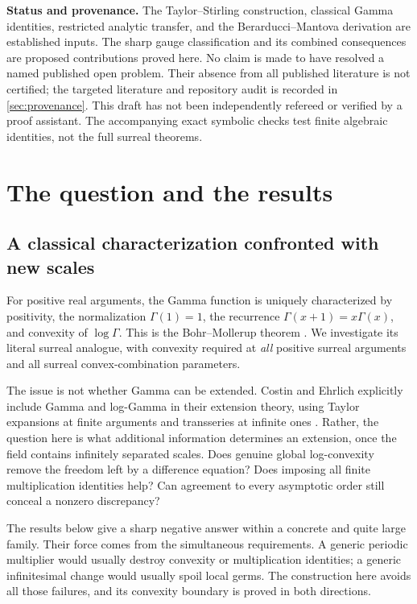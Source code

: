 \documentclass[11pt,letterpaper]{article}
\numberwithin{equation}{section}
\theoremstyle{plain}
\theoremstyle{definition}
\theoremstyle{remark}
\begin{document}
\begin{titlepage}
\begin{minipage}{0.94\textwidth}
\textbf{Status and provenance.}
The Taylor--Stirling construction, classical Gamma identities, restricted
analytic transfer, and the Berarducci--Mantova derivation are established inputs.
The sharp gauge classification and its combined consequences are proposed
contributions proved here. No claim is made to have resolved a named published
open problem. Their absence from all published literature is not certified;
the targeted literature and repository audit is recorded in
\cref{sec:provenance}. This draft has not been independently refereed or
verified by a proof assistant. The accompanying exact symbolic checks test
finite algebraic identities, not the full surreal theorems.
\end{minipage}
\end{titlepage}
\hypersetup{pageanchor=true}%

\tableofcontents
\clearpage

\section{The question and the results}\label{sec:introduction}

\subsection{A classical characterization confronted with new scales}
For positive real arguments, the Gamma function is uniquely characterized by
positivity, the normalization $\Gamma(1)=1$, the recurrence
$\Gamma(x+1)=x\Gamma(x)$, and convexity of $\log\Gamma$. This is the
Bohr--Mollerup theorem \cite[\S5.5(iv)]{DLMF55}. We investigate its literal
surreal analogue, with convexity required at \emph{all} positive surreal
arguments and all surreal convex-combination parameters.

The issue is not whether Gamma can be extended. Costin and Ehrlich explicitly
include Gamma and log-Gamma in their extension theory, using Taylor expansions
at finite arguments and transseries at infinite ones
\cite[\S\S8,10.1(v)]{CE}. Rather, the question here is what additional
information determines an extension, once the field contains infinitely
separated scales. Does genuine global log-convexity remove the freedom left by
a difference equation? Does imposing all finite multiplication identities help?
Can agreement to every asymptotic order still conceal a nonzero discrepancy?

The results below give a sharp negative answer within a concrete and quite
large family. Their force comes from the simultaneous requirements. A generic
periodic multiplier would usually destroy convexity or multiplication
identities; a generic infinitesimal change would usually spoil local germs.
The construction here avoids all those failures, and its convexity boundary is
proved in both directions.
\end{document}
